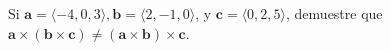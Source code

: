 \item Si $\mathbf{a} = \langle -4, 0, 3 \rangle, \mathbf{b} = \langle 2, -1, 0 \rangle$, y $\mathbf{c} = \langle 0, 2, 5 \rangle$, demuestre que $\mathbf{a} \times (\mathbf{b} \times \mathbf{c}) \neq (\mathbf{a} \times \mathbf{b}) \times \mathbf{c}$.
